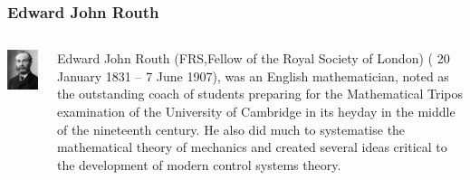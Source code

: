 \documentclass{beamer}
\begin{document}
\begin{frame}
\frametitle{Edward John Routh}
\label{sec-2-4}
\begin{columns}
\begin{column}{0.3\textwidth}
\label{sec-2-4-1}

   \includegraphics[width=.9\linewidth]{image/Routh.jpg}
\end{column}
\begin{column}{0.7\textwidth}
\label{sec-2-4-2}


   Edward John Routh (FRS,Fellow of the Royal Society of London) ( 20 January 1831 – 7 June 1907), was an English mathematician, noted as the outstanding coach of students preparing for the Mathematical Tripos examination of the University of Cambridge in its heyday in the middle of the nineteenth century. He also did much to systematise the mathematical theory of mechanics and created several ideas critical to the development of modern control systems theory.
\end{column}
\end{columns}
\end{frame}
\end{document}
